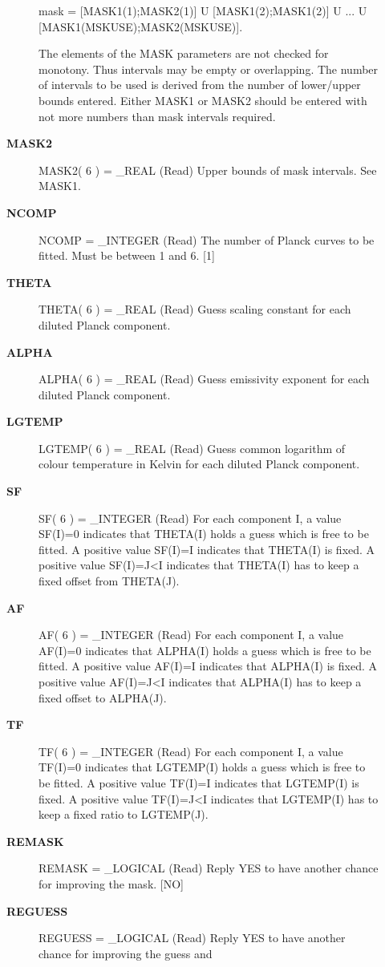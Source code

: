 \begin{description}
\begin{description}
      mask = [MASK1(1);MASK2(1)] U [MASK1(2);MASK1(2)]
           U ...
           U [MASK1(MSKUSE);MASK2(MSKUSE)].

   The elements of the MASK parameters are not checked for
   monotony. Thus intervals may be empty or overlapping. The
   number of intervals to be used is derived from the number of
   lower/upper bounds entered. Either MASK1 or MASK2 should be
   entered with not more numbers than mask intervals required.
\item [{\bf MASK2}]
MASK2( 6 ) = _REAL (Read)
   Upper bounds of mask intervals. See MASK1.
\item [{\bf NCOMP}]
NCOMP = _INTEGER (Read)
   The number of Planck curves to be fitted. Must be between 1
   and 6. [1]
\item [{\bf THETA}]
THETA( 6 ) = _REAL (Read)
   Guess scaling constant for each diluted Planck component.
\item [{\bf ALPHA}]
ALPHA( 6 ) = _REAL (Read)
   Guess emissivity exponent for each diluted Planck component.
\item [{\bf LGTEMP}]
LGTEMP( 6 ) = _REAL (Read)
   Guess common logarithm of colour temperature in Kelvin for
   each diluted Planck component.
\item [{\bf SF}]
SF( 6 ) = _INTEGER (Read)
   For each component I, a value SF(I)=0 indicates that
   THETA(I) holds a guess which is free to be fitted.
   A positive value SF(I)=I indicates that THETA(I) is fixed.
   A positive value SF(I)=J<I indicates that THETA(I) has to
   keep a fixed offset from THETA(J).
\item [{\bf AF}]
AF( 6 ) = _INTEGER (Read)
   For each component I, a value AF(I)=0 indicates that
   ALPHA(I) holds a guess which is free to be fitted.
   A positive value AF(I)=I indicates that ALPHA(I) is fixed.
   A positive value AF(I)=J<I indicates that ALPHA(I) has to
   keep a fixed offset to ALPHA(J).
\item [{\bf TF}]
TF( 6 ) = _INTEGER (Read)
   For each component I, a value TF(I)=0 indicates that
   LGTEMP(I) holds a guess which is free to be fitted.
   A positive value TF(I)=I indicates that LGTEMP(I) is fixed.
   A positive value TF(I)=J<I indicates that LGTEMP(I) has to
   keep a fixed ratio to LGTEMP(J).
\item [{\bf REMASK}]
REMASK = _LOGICAL (Read)
   Reply YES to have another chance for improving the mask.
   [NO]
\item [{\bf REGUESS}]
REGUESS = _LOGICAL (Read)
   Reply YES to have another chance for improving the guess and

\end{description}
\end{description}
